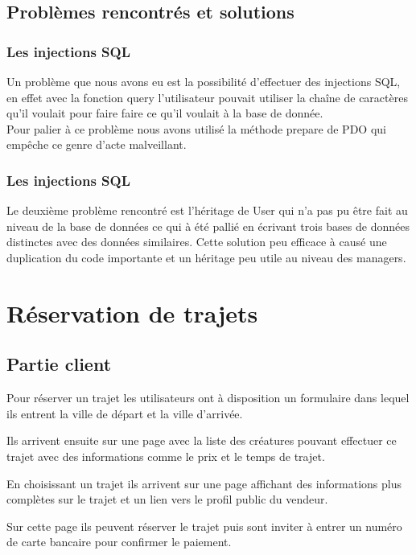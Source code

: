 \documentclass{article}
\begin{document}
	\subsection{Problèmes rencontrés et solutions}
		\subsubsection{Les injections SQL}
			Un problème que nous avons eu est la possibilité d'effectuer des injections SQL, en effet avec la fonction query l'utilisateur pouvait utiliser la chaîne de caractères qu'il voulait pour faire faire ce qu'il voulait à la base de donnée.\\ Pour palier à ce problème nous avons utilisé la méthode prepare de PDO qui empêche ce genre d'acte malveillant.
		\subsubsection{Les injections SQL}
			Le deuxième problème rencontré est l'héritage de User qui n'a pas pu être fait au niveau de la base de données ce qui à été pallié en écrivant trois bases de données distinctes avec des données similaires. Cette solution peu efficace à causé une duplication du code importante et un héritage peu utile au niveau des managers.
			
\section{Réservation de trajets}
    \subsection{Partie client}
        Pour réserver un trajet les utilisateurs ont à disposition un formulaire dans lequel ils entrent la ville de départ et la ville d'arrivée.
        
        Ils arrivent ensuite sur une page avec la liste des créatures pouvant effectuer ce trajet avec des informations comme le prix et le temps de trajet.
        
        En choisissant un trajet ils arrivent sur une page affichant des informations plus complètes sur le trajet et un lien vers le profil public du vendeur.
        
        Sur cette page ils peuvent réserver le trajet puis sont inviter à entrer un numéro de carte bancaire pour confirmer le paiement.
        \\
        
\end{document}
